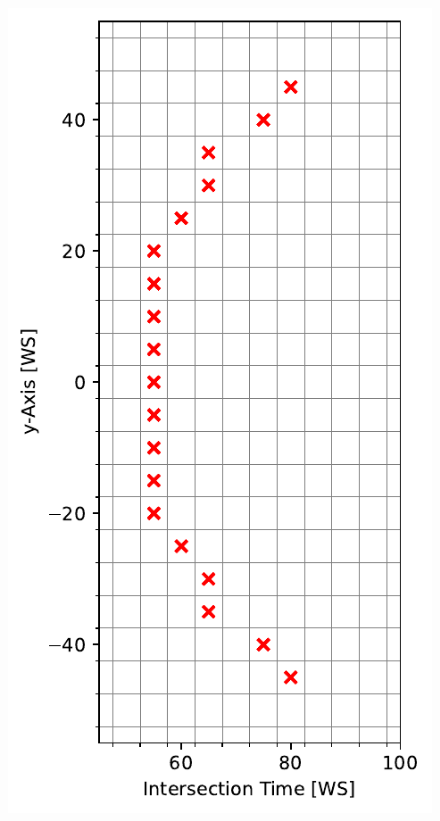 \begin{figure}[h]
	  \includegraphics[width=\linewidth]{res/intersection_time.pdf}
	\endminipage\hfill

\end{figure}
